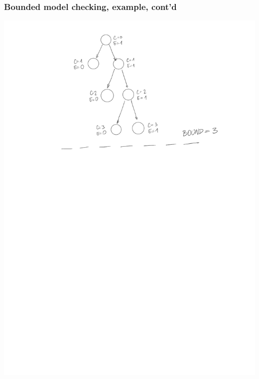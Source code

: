 \documentclass[usenames,dvipsnames]{beamer}
\begin{document}
\begin{frame}
  \frametitle{Bounded model checking, example, cont'd}
  
  \centering
  \includegraphics[scale=.6]{boundedmc}
  
\end{frame}

\end{document}
